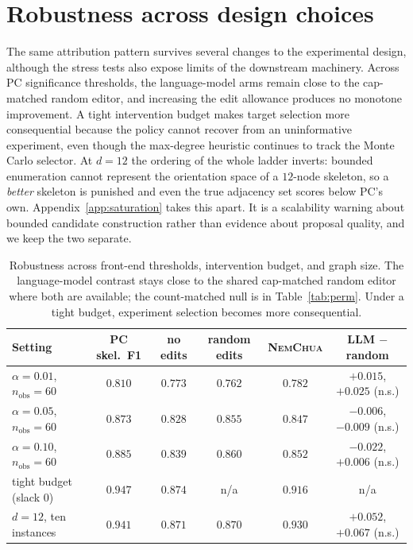 \documentclass{article}
\newcommand{\nem}{\textsc{NemChua}}
\begin{document}
\section{Robustness across design choices}
\label{sec:robust}

The same attribution pattern survives several changes to the experimental design, although the
stress tests also expose limits of the downstream machinery. Across PC significance thresholds, the
language-model arms remain close to the cap-matched random editor, and increasing the edit allowance
produces no monotone improvement. A tight intervention budget makes target selection more
consequential because the policy cannot recover from an uninformative experiment, even though the
max-degree heuristic continues to track the Monte Carlo selector. At $d{=}12$ the ordering of the
whole ladder inverts: bounded enumeration cannot represent the orientation space of a $12$-node
skeleton, so a \emph{better} skeleton is punished and even the true adjacency set scores below PC's
own. Appendix~\ref{app:saturation} takes this apart. It is a scalability warning about bounded
candidate construction rather than evidence about proposal quality, and we keep the two separate.

\begin{table}[h]
\caption{Robustness across front-end thresholds, intervention budget, and graph size. The
language-model contrast stays close to the shared cap-matched random editor where both are
available; the count-matched null is in Table~\ref{tab:perm}. Under a tight budget, experiment
selection becomes more consequential.}
\label{tab:robust}
\centering
\small
\setlength{\tabcolsep}{4.5pt}
\begin{tabular}{lccccc}
\toprule
Setting & PC skel.\ F1 & no edits & random edits & \nem{} & LLM $-$ random \\
\midrule
$\alpha = 0.01$, $n_{\mathrm{obs}}{=}60$ & $0.810$ & $0.773$ & $0.762$ & $0.782$ & $+0.015$, $+0.025$ (n.s.) \\
$\alpha = 0.05$, $n_{\mathrm{obs}}{=}60$ & $0.873$ & $0.828$ & $0.855$ & $0.847$ & $-0.006$, $-0.009$ (n.s.) \\
$\alpha = 0.10$, $n_{\mathrm{obs}}{=}60$ & $0.885$ & $0.839$ & $0.860$ & $0.852$ & $-0.022$, $+0.006$ (n.s.) \\
\midrule
tight budget (slack $0$) & $0.947$ & $0.874$ & n/a & $0.916$ & n/a \\
$d = 12$, ten instances & $0.941$ & $0.871$ & $0.870$ & $0.930$ & $+0.052$, $+0.067$ (n.s.) \\
\bottomrule
\end{tabular}
\end{table}
\end{document}
